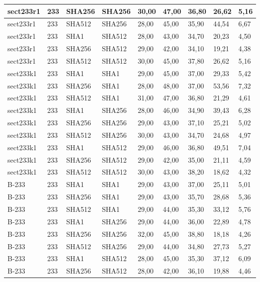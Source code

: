 \begin{longtable}{| l | l | l | l | l |l |l |l |l |}
sect233r1 & 233 & SHA256 & SHA256 & 30,00 & 47,00 & 36,80 & 26,62 & 5,16 \\ \hline 
sect233r1 & 233 & SHA512 & SHA256 & 28,00 & 45,00 & 35,90 & 44,54 & 6,67 \\ \hline 
sect233r1 & 233 & SHA1 & SHA512 & 28,00 & 43,00 & 34,70 & 20,23 & 4,50 \\ \hline 
sect233r1 & 233 & SHA256 & SHA512 & 29,00 & 42,00 & 34,10 & 19,21 & 4,38 \\ \hline 
sect233r1 & 233 & SHA512 & SHA512 & 30,00 & 45,00 & 37,80 & 26,62 & 5,16 \\ \hline 
sect233k1 & 233 & SHA1 & SHA1 & 29,00 & 45,00 & 37,00 & 29,33 & 5,42 \\ \hline 
sect233k1 & 233 & SHA256 & SHA1 & 28,00 & 48,00 & 37,00 & 53,56 & 7,32 \\ \hline 
sect233k1 & 233 & SHA512 & SHA1 & 31,00 & 47,00 & 36,80 & 21,29 & 4,61 \\ \hline 
sect233k1 & 233 & SHA1 & SHA256 & 28,00 & 46,00 & 34,90 & 39,43 & 6,28 \\ \hline 
sect233k1 & 233 & SHA256 & SHA256 & 29,00 & 43,00 & 37,10 & 25,21 & 5,02 \\ \hline 
sect233k1 & 233 & SHA512 & SHA256 & 30,00 & 43,00 & 34,70 & 24,68 & 4,97 \\ \hline 
sect233k1 & 233 & SHA1 & SHA512 & 29,00 & 46,00 & 36,80 & 49,51 & 7,04 \\ \hline 
sect233k1 & 233 & SHA256 & SHA512 & 29,00 & 42,00 & 35,00 & 21,11 & 4,59 \\ \hline 
sect233k1 & 233 & SHA512 & SHA512 & 30,00 & 43,00 & 38,20 & 18,62 & 4,32 \\ \hline 
B-233 & 233 & SHA1 & SHA1 & 29,00 & 43,00 & 37,00 & 25,11 & 5,01 \\ \hline 
B-233 & 233 & SHA256 & SHA1 & 29,00 & 43,00 & 35,70 & 28,68 & 5,36 \\ \hline 
B-233 & 233 & SHA512 & SHA1 & 29,00 & 44,00 & 35,30 & 33,12 & 5,76 \\ \hline 
B-233 & 233 & SHA1 & SHA256 & 29,00 & 44,00 & 36,00 & 22,89 & 4,78 \\ \hline 
B-233 & 233 & SHA256 & SHA256 & 32,00 & 45,00 & 38,80 & 18,18 & 4,26 \\ \hline 
B-233 & 233 & SHA512 & SHA256 & 29,00 & 44,00 & 34,80 & 27,73 & 5,27 \\ \hline 
B-233 & 233 & SHA1 & SHA512 & 28,00 & 45,00 & 35,30 & 37,12 & 6,09 \\ \hline 
B-233 & 233 & SHA256 & SHA512 & 28,00 & 42,00 & 36,10 & 19,88 & 4,46 \\ \hline 

\end{longtable}
